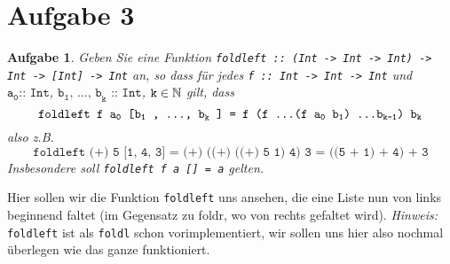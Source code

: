 \documentclass[ngerman, a4paper, 11pt]{article}
\theoremstyle{nonumberplain}
\newtheorem{aufgabe}{Aufgabe}
\begin{document}
\section*{Aufgabe 3}

\begin{aufgabe}
	Geben Sie eine Funktion \texttt{foldleft :: (Int -> Int -> Int) -> Int -> [Int] -> Int} an,
	so dass für jedes \texttt{f :: Int -> Int -> Int} und $\texttt{a}_\texttt{0} \texttt{:: Int}$, $\texttt{b}_\texttt{1}\texttt{, }\dots\texttt{, b}_\texttt{k}\texttt{ :: Int}$, $\texttt{k} \in \mathbb{N}$ gilt, dass
	\begin{equation*}
		\texttt{foldleft f a}_\texttt{0} \texttt{ [b}_\texttt{1}\texttt{ , \dots , b}_\texttt{k}\texttt{ ] = f (f \dots (f a}_\texttt{0}\texttt{ b}_\texttt{1}\texttt{) \dots b}_{\texttt{k-1}}\texttt{) b}_\texttt{k}
	\end{equation*}
	also z.B.
	\begin{equation*}
		\texttt{foldleft (+) 5 [1, 4, 3] = (+) ((+) ((+) 5 1) 4) 3 = ((5 + 1) + 4) + 3}
	\end{equation*}
	Insbesondere soll \texttt{foldleft f a [] = a} gelten.
\end{aufgabe}

Hier sollen wir die Funktion \texttt{foldleft} uns ansehen, die eine Liste nun von links beginnend faltet (im Gegensatz zu foldr, wo von rechts gefaltet wird). \textit{Hinweis:} \texttt{foldleft} ist als \texttt{foldl} schon vorimplementiert, wir sollen uns hier also nochmal überlegen wie das ganze funktioniert.
\end{document}
